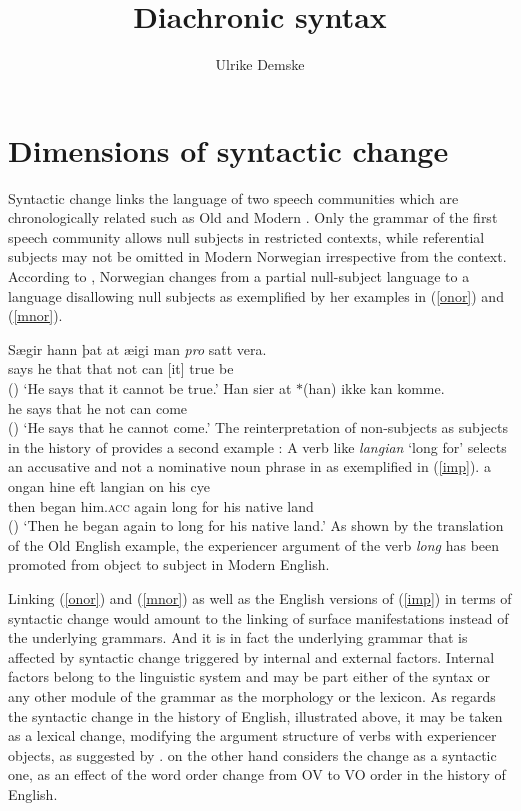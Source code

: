\documentclass[output=paper
                ,modfonts
                ,nonflat
	        ,collection
	        ,collectionchapter
	        ,collectiontoclongg
 	        ,biblatex
                ,babelshorthands
                ,newtxmath
                ,draftmode
                ,colorlinks, citecolor=brown
]{./langsci/langscibook}
\title{Diachronic syntax}
\author{%
 Ulrike Demske\affiliation{Universität Potsdam}
}
\begin{document}
\label{chap-diachronic}
\maketitle

\section{Dimensions of syntactic change} 

Syntactic change links the language of two speech communities which are chronologically related such as Old  and Modern . Only the grammar of the first speech community allows null subjects in restricted contexts, while referential subjects may not be omitted in Modern Norwegian irrespective from the context. According to \cite{kinn2015}, Norwegian changes from a partial null-subject language to a language disallowing null subjects as exemplified by her examples in (\ref{onor}) and (\ref{mnor}).

\eal 
\ex \label{onor}
\gll Sægir hann þat  at   æigi  man \textit{pro} satt vera.\\ 
     says  he   that that not   can [it] true be \\\hfill()
\glt `He says that it cannot be true.'  
\ex \label{mnor}
\gll Han sier at $*$(han) ikke kan komme.\\ 
     he says that he not can come \\ \hfill () 
\glt `He says that he cannot come.' 
\zl
The reinterpretation of non-subjects as subjects in the history of  provides a second example \citep{denison1993}: A verb like \textit{langian} `long for' selects an accusative and not a nominative noun phrase in  as exemplified in (\ref{imp}). 
\ea \label{imp}
\gll \th a ongan hine eft langian on his cy\th \th e  \\ then began him.\textsc{acc} again long for his {native land} \\ \hfill ()
\glt `Then he began again to long for his native land.' 
\z
As shown by the translation of the Old English example, the experiencer argument of the verb \textit{long} has been promoted from object to subject in Modern English. 

Linking (\ref{onor}) and (\ref{mnor}) as well as the English versions of (\ref{imp}) in terms of syntactic change would amount to the linking of surface manifestations instead of the underlying grammars. And it is in fact the underlying grammar that is affected by syntactic change triggered by internal and external factors. Internal factors belong to the linguistic system and may be part either of the syntax or any other module of the grammar as the morphology or the lexicon. As regards the syntactic change in the history of English, illustrated above, it may be taken as a lexical change, modifying the argument structure of verbs with experiencer objects, as suggested by \cite{denison1993}. \cite{lightfoot1979} on the other hand considers the change as a syntactic one, \ie as an effect of the word order change from OV to VO order in the history of English. 
\end{document}

